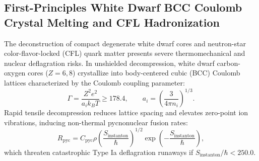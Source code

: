 \documentclass[11pt,onecolumn]{article}
\begin{document}
\subsection{First-Principles White Dwarf BCC Coulomb Crystal Melting and CFL Hadronization}
\label{subsec:wd_coulomb_cfl_hadronize}\label{subsec:white_dwarf_melting}
The deconstruction of compact degenerate white dwarf cores and neutron-star color-flavor-locked (CFL) quark matter presents severe thermomechanical and nuclear deflagration risks. In unshielded decompression, white dwarf carbon-oxygen cores ($Z=6, 8$) crystallize into body-centered cubic (BCC) Coulomb lattices characterized by the Coulomb coupling parameter:
\begin{equation}
\Gamma = \frac{Z^2 e^2}{a_i k_B T} \ge 178.4, \qquad a_i = \left(\frac{3}{4\pi n_i}\right)^{1/3}.
\label{eq:coulomb_gamma_bcc}
\end{equation}
Rapid tensile decompression reduces lattice spacing and elevates zero-point ion vibrations, inducing non-thermal pycnonuclear fusion rates:
\begin{equation}
R_{\text{pyc}} = C_{\text{pyc}} \rho \left(\frac{S_{\text{instanton}}}{\hbar}\right)^{1/2} \exp\left(-\frac{S_{\text{instanton}}}{\hbar}\right),
\label{eq:pycnonuclear_rate_wkb}
\end{equation}
which threaten catastrophic Type Ia deflagration runaways if $S_{\text{instanton}} / \hbar < 250.0$.
\end{document}

